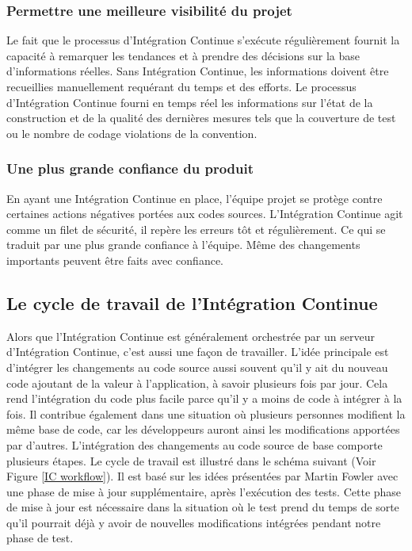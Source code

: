 \documentclass{report}
\begin{document}
        \subsubsection{Permettre une meilleure visibilité du projet}
        Le fait que le processus d’Intégration Continue s’exécute régulièrement fournit la capacité à remarquer les tendances et à prendre des décisions sur la base d’informations réelles. Sans Intégration Continue, les informations doivent être recueillies manuellement requérant du temps et des efforts. Le  processus d’Intégration Continue fourni en temps réel les informations sur l'état de la construction et de la qualité des dernières mesures tels que la couverture de test ou le nombre de codage violations de la convention.

        \subsubsection{Une plus grande confiance du produit}
        En ayant une Intégration Continue en place, l'équipe projet se protège contre certaines actions négatives portées aux codes sources. L’Intégration Continue agit comme un filet de sécurité, il repère les erreurs tôt et régulièrement. Ce qui se traduit par une plus grande confiance à l'équipe. Même des changements importants peuvent être faits avec confiance.

      \subsection{Le cycle de travail de l’Intégration Continue}
      Alors que l’Intégration Continue est généralement orchestrée par un serveur d’Intégration Continue, c’est aussi une façon de travailler. L'idée principale est d'intégrer les changements au code source aussi souvent qu’il y ait du nouveau code ajoutant de la valeur à l’application, à savoir plusieurs fois par jour. Cela rend l'intégration du code plus facile parce qu'il y a moins de code à intégrer à la fois. Il contribue également dans une situation où plusieurs personnes modifient la même base de code, car les développeurs auront ainsi les modifications apportées par d'autres.
      L'intégration des changements au code source de base comporte plusieurs étapes. Le cycle de travail est illustré dans le schéma suivant (Voir Figure \ref{IC workflow}). Il est basé sur les idées présentées par Martin Fowler \cite{Fow00} avec une phase de mise à jour supplémentaire, après l'exécution des tests. Cette phase de mise à jour est nécessaire dans la situation où le test prend du temps de sorte qu'il pourrait déjà y avoir de nouvelles modifications intégrées pendant notre phase de test.\\
\end{document}
